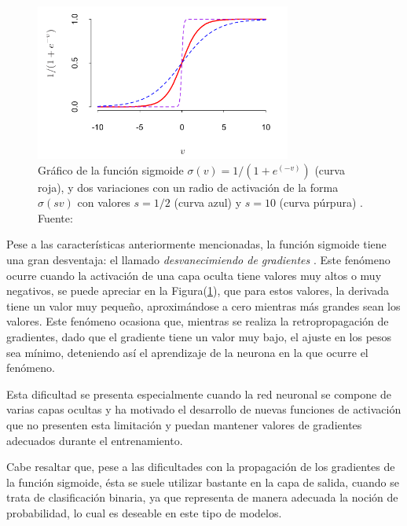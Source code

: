             \begin{figure}[!h] 
                \centering
                \includegraphics[width=0.75\textwidth]{img/sigmoide}
                \caption{Gráfico de la función sigmoide $\sigma(v) = 1 / (1 + e^{(-v)})$ (curva roja), y dos variaciones con un radio de activación de la forma $\sigma(sv)$ con valores $s=1/2$ (curva azul) y $s=10$ (curva púrpura) . Fuente: \cite{Goodfellow-et-al-2016} }
                \label{fig:sigmoide}
            \end{figure}
            
            Pese a las características anteriormente mencionadas, la función sigmoide tiene una gran desventaja: el llamado 
            \textit{desvanecimiendo de gradientes} \cite{hochreiter1998vanishing}. Este fenómeno ocurre cuando la activación 
            de una capa oculta tiene valores muy altos o muy negativos, se puede apreciar en la Figura(\ref{fig:sigmoide}), que 
            para estos valores, la derivada tiene un valor muy pequeño, aproximándose a cero mientras más grandes sean los valores.
            Este fenómeno ocasiona que, mientras se realiza la retropropagación de gradientes, dado que el gradiente tiene un valor 
            muy bajo, el ajuste en los pesos sea mínimo, deteniendo así el aprendizaje de la neurona en la que ocurre el fenómeno.

            Esta dificultad se presenta especialmente cuando la red neuronal se compone de varias capas ocultas y 
            ha motivado el desarrollo de nuevas funciones de activación que no presenten esta limitación y puedan 
            mantener valores de gradientes adecuados durante el entrenamiento.
            
            Cabe resaltar que, pese a las dificultades con la propagación de los gradientes de la función sigmoide, ésta se suele 
            utilizar bastante en la capa de salida, cuando se trata de clasificación binaria, ya que representa de manera adecuada
            la noción de probabilidad, lo cual es deseable en este tipo de modelos.

